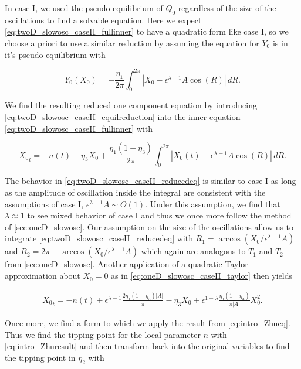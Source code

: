 \indent In case I, we used the pseudo-equilibrium of $Q_0$ regardless of the size of the oscillations to find a solvable equation. Here we expect \eqref{eq:twoD_slowosc_caseII_fullinner} to have a quadratic form like case I, so we choose a priori to use a similar reduction by assuming the equation for $Y_0$ is in it's pseudo-equilibrium with

\begin{equation}\label{eq:twoD_slowosc_caseII_equilreduction}
{Y_0}(X_0)= -\frac{\eta_1}{2\pi}\int_0^{2\pi}|X_0-\epsilon^{\lambda-1}A\cos(R)|\,dR.
\end{equation}

We find the resulting reduced one component equation by introducing \eqref{eq:twoD_slowosc_caseII_equilreduction} into the inner equation \eqref{eq:twoD_slowosc_caseII_fullinner} with

\begin{equation}\label{eq:twoD_slowosc_caseII_reducedeq}
{X_0}_t = -n(t)-\eta_3 X_0+\frac{\eta_1(1-\eta_3)}{2\pi}\int_0^{2\pi}|X_0(t)-\epsilon^{\lambda-1}A\cos(R)|\,dR.
\end{equation}

\indent The behavior in \eqref{eq:twoD_slowosc_caseII_reducedeq} is similar to case I as long as the amplitude of oscillation inside the integral are consistent with the assumptions of case I, $\epsilon^{\lambda-1}A \sim O(1)$. Under this assumption, we find that $\lambda \approx 1$ to see mixed behavior of case I and thus we once more follow the method of \autoref{sec:oneD_slowosc}. Our assumption on the size of the oscillations allow us to integrate \eqref{eq:twoD_slowosc_caseII_reducedeq} with $R_1= \arccos(X_0/\epsilon^{\lambda-1}A)$ and $R_2 = 2\pi - \arccos(X_0/\epsilon^{\lambda-1}A)$ which again are analogous to $T_1$ and $T_2$ from \autoref{sec:oneD_slowosc}. Another application of a quadratic Taylor approximation about $X_0=0$ as in \eqref{eq:oneD_slowosc_caseII_taylor} then yields

\begin{equation}\label{eq:twoD_slowosc_caseII_taylor}
\begin{aligned}
{X_0}_t = -n(t) +\epsilon^{\lambda-1}\frac{2\eta_1(1-\eta_3)|A|}{\pi}-\eta_3 X_0 +\epsilon^{1-\lambda}\frac{\eta_1(1-\eta_3)}{\pi |A|}X_0^2.
\end{aligned}
\end{equation}

Once more, we find a form to which we apply the result from \eqref{eq:intro_Zhueq}. Thus we find the tipping point for the local parameter $n$ with \eqref{eq:intro_Zhuresult} and then transform back into the original variables to find the tipping point in $\eta_2$ with

